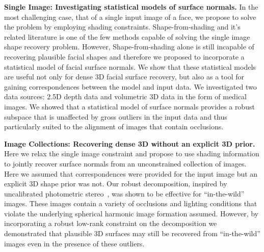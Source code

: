 \textbf{Single Image: Investigating statistical models of surface normals.}
In the most challenging case, that of a single
input image of a face, we propose to solve the problem by employing shading
constraints. Shape-from-shading and it's related literature is one of the
few methods capable of solving the single image shape recovery problem. However,
Shape-from-shading alone is still incapable of recovering plausible facial shapes
and therefore we proposed to incorporate a statistical model of facial surface
normals. We show that these statistical models are useful not only for dense
3D facial surface recovery, but also as a tool for gaining correspondences
between the model and input data. We investigated two data sources: 2.5D
depth data and volumetric 3D data in the form of medical images. We showed
that a statistical model of surface normals provides a robust subspace that
is unaffected by gross outliers in the input data and thus particularly suited
to the alignment of images that contain occlusions.

\textbf{Image Collections: Recovering dense 3D without an explicit 3D prior.}
Here we relax the single image constraint and propose to use shading information
to jointly recover surface normals from an unconstrained collection of images.
Here we assumed that correspondences were provided for the input image but
an explicit 3D shape prior was not. Our robust decomposition, inspired by
uncalibrated photometric stereo~\cite{basri2007photometric}, was shown to
be effective for ``in-the-wild'' images. These images contain a variety of 
occlusions and lighting conditions that violate the underlying spherical
harmonic image formation assumed. However, by incorporating a robust low-rank
constraint on the decomposition we demonstrated that plausible 3D surfaces
may still be recovered from ``in-the-wild'' images even in the presence
of these outliers.

